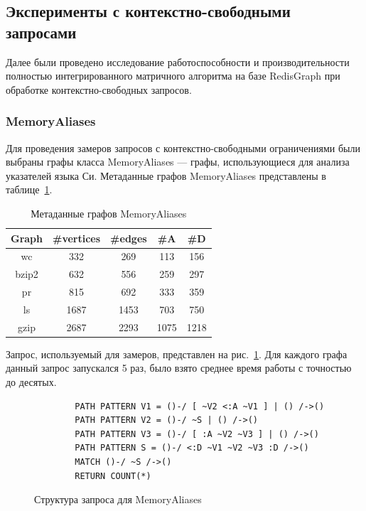 \documentclass[14pt]{matmex-diploma-custom}
\begin{document}
\subsection{Эксперименты с контекстно-свободными запросами}
Далее были проведено исследование работоспособности и производительности полностью интегрированного матричного алгоритма на базе RedisGraph при обработке контекстно-свободных запросов.

\subsubsection{MemoryAliases}
Для проведения замеров запросов с контекстно-свободными ограничениями были выбраны графы класса MemoryAliases --- графы, использующиеся для анализа указателей языка Си. Метаданные графов MemoryAliases представлены в таблице~\ref{tab:memoryal_meta}.

\begin{table}[h!]
    \centering
    \begin{tabular}{|c||c|c|c|c|}
         \hline
         Graph & \#vertices & \#edges & \#A & \#D \\
         \hline \hline
         wc & 332 & 269 & 113 & 156\\
         bzip2 & 632 & 556 & 259 & 297\\
         pr & 815 & 692 & 333 & 359\\
         ls & 1687 & 1453 & 703 & 750\\
         gzip & 2687 & 2293 & 1075 & 1218\\
         \hline
    \end{tabular}
    \caption{Метаданные графов MemoryAliases}
    \label{tab:memoryal_meta}
\end{table}

Запрос, используемый для замеров, представлен на рис.~\ref{memoryal_q}. Для каждого графа данный запрос запускался 5 раз, было взято среднее время работы с точностью до десятых.

\begin{figure}[h!]
    \begin{verbatim}
        PATH PATTERN V1 = ()-/ [ ~V2 <:A ~V1 ] | () /->()
        PATH PATTERN V2 = ()-/ ~S | () /->()
        PATH PATTERN V3 = ()-/ [ :A ~V2 ~V3 ] | () /->()
        PATH PATTERN S = ()-/ <:D ~V1 ~V2 ~V3 :D /->()
        MATCH ()-/ ~S /->()
        RETURN COUNT(*)
    \end{verbatim}
    \caption{Структура запроса для MemoryAliases}
    \label{memoryal_q}
\end{figure}
\end{document}
